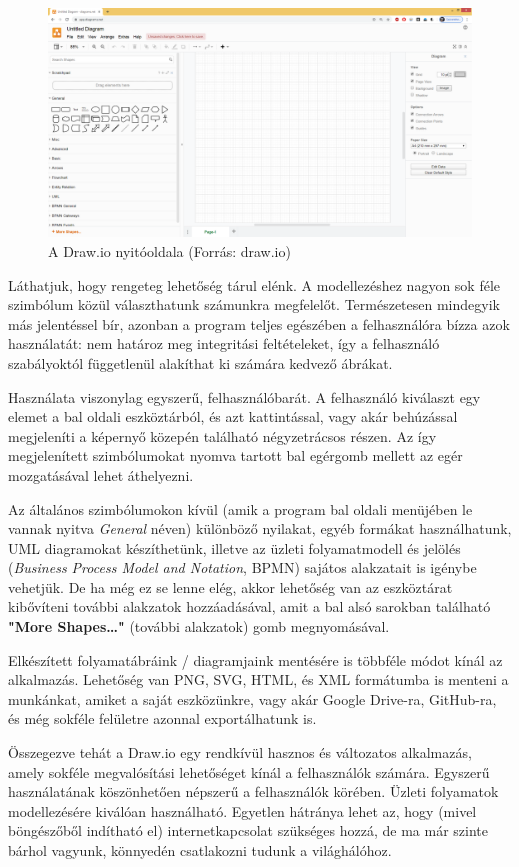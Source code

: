 \begin{figure}[h]
\centering
\includegraphics[scale=0.3]{images/drawio.png}
\caption{A Draw.io nyitóoldala (Forrás: draw.io)}
\label{fig:drawio}
\end{figure}

Láthatjuk, hogy rengeteg lehetőség tárul elénk. A modellezéshez nagyon sok féle szimbólum közül választhatunk számunkra megfelelőt. Természetesen mindegyik más jelentéssel bír, azonban a program teljes egészében a felhasználóra bízza azok használatát: nem határoz meg integritási feltételeket, így a felhasználó szabályoktól függetlenül alakíthat ki számára kedvező ábrákat.

Használata viszonylag egyszerű, felhasználóbarát. A felhasználó kiválaszt egy elemet a bal oldali eszköztárból, és azt kattintással, vagy akár behúzással megjeleníti a képernyő közepén található négyzetrácsos részen. Az így megjelenített szimbólumokat nyomva tartott bal egérgomb mellett az egér mozgatásával lehet áthelyezni.

Az általános szimbólumokon kívül (amik a program bal oldali menüjében le vannak nyitva \textit{General} néven) különböző nyilakat, egyéb formákat használhatunk, UML diagramokat készíthetünk, illetve az üzleti folyamatmodell és jelölés (\textit{Business Process Model and Notation}, BPMN) sajátos alakzatait is igénybe vehetjük. De ha még ez se lenne elég, akkor lehetőség van az eszköztárat kibővíteni további alakzatok hozzáadásával, amit a bal alsó sarokban található \textbf{"More Shapes\ldots"} (további alakzatok) gomb megnyomásával.

Elkészített folyamatábráink / diagramjaink mentésére is többféle módot kínál az alkalmazás. Lehetőség van PNG, SVG, HTML, és XML formátumba is menteni a munkánkat, amiket a saját eszközünkre, vagy akár Google Drive-ra, GitHub-ra, és még sokféle felületre azonnal exportálhatunk is.

Összegezve tehát a Draw.io egy rendkívül hasznos és változatos alkalmazás, amely sokféle megvalósítási lehetőséget kínál a felhasználók számára. Egyszerű használatának köszönhetően népszerű a felhasználók körében. Üzleti folyamatok modellezésére kiválóan használható. Egyetlen hátránya lehet az, hogy (mivel böngészőből indítható el) internetkapcsolat szükséges hozzá, de ma már szinte bárhol vagyunk, könnyedén csatlakozni tudunk a világhálóhoz.
